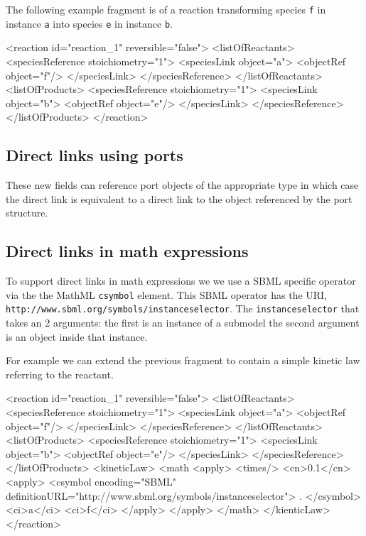 \documentclass{cekarticle}
\begin{document}
The following example fragment is of a reaction transforming species \texttt{f} in instance \texttt{a} 
into species \texttt{e} in instance \texttt{b}.
\begin{example}
<reaction id="reaction_1" reversible="false">
    <listOfReactants>
        <speciesReference stoichiometry="1">
            <speciesLink object="a">
                <objectRef object="f"/>
            </speciesLink>
        </speciesReference>
    </listOfReactants>
    <listOfProducts>
        <speciesReference stoichiometry="1">
            <speciesLink object="b">
                <objectRef object="e"/>
            </speciesLink>
        </speciesReference>
    </listOfProducts>
</reaction>
\end{example}

\subsection{Direct links using ports}

These new  fields can reference port objects of the appropriate type in which
case the direct link is equivalent to a direct link to the object referenced by the port structure.

\subsection{Direct links in math expressions}

To support direct links in math expressions we we
use a SBML specific operator via the the MathML \texttt{csymbol} element.
This SBML operator has the URI, \texttt{http://www.sbml.org/symbols/instanceselector}.
The \texttt{instanceselector} that takes an 2 arguments: the first is an instance of a submodel
the second argument is an object inside that instance.

For example we can extend the previous fragment to contain a simple kinetic law referring to the reactant.

\begin{example}
<reaction id="reaction_1" reversible="false">
    <listOfReactants>
        <speciesReference stoichiometry="1">
            <speciesLink object="a">
                <objectRef object="f"/>
            </speciesLink>
        </speciesReference>
    </listOfReactants>
    <listOfProducts>
        <speciesReference stoichiometry="1">
            <speciesLink object="b">
                <objectRef object="e"/>
            </speciesLink>
        </speciesReference>
    </listOfProducts>
    <kineticLaw>
        <math 
            <apply>
                <times/>
                <cn>0.1</cn>
                <apply>
                    <csymbol
                        encoding="SBML"
                        definitionURL="http://www.sbml.org/symbols/instanceselector">
                        .
                    </csymbol>
                    <ci>a</ci>
                    <ci>f</ci>
                </apply>
            </apply>    
        </math>
    </kienticLaw>
</reaction>
\end{example}
\end{document}
